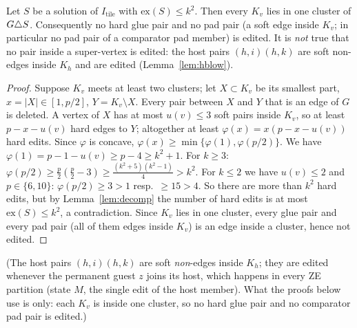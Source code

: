\begin{lemma}\label{lem:hsplit}
Let $S$ be a solution of $I_{\mathrm{tile}}$ with $\mathrm{ex}(S)\le k^2$. Then every $K_v$ lies in one cluster of $G\triangle S$. Consequently no hard glue pair and no pad pair (a soft edge inside $K_v$; in particular no pad pair of a comparator pad member) is edited. It is \emph{not} true that no pair inside a super-vertex is edited: the host pairs $(h,i)(h,k)$ are soft non-edges inside $K_h$ and are edited (Lemma~\ref{lem:hblow}).
\end{lemma}
\begin{proof}
Suppose $K_v$ meets at least two clusters; let $X\subset K_v$ be its smallest part, $x=|X|\in[1,p/2]$, $Y=K_v\setminus X$. Every pair between $X$ and $Y$ that is an edge of $G$ is deleted. A vertex of $X$ has at most $u(v)\le3$ soft pairs inside $K_v$, so at least $p-x-u(v)$ hard edges to $Y$; altogether at least $\varphi(x)=x(p-x-u(v))$ hard edits. Since $\varphi$ is concave, $\varphi(x)\ge\min\{\varphi(1),\varphi(p/2)\}$. We have $\varphi(1)=p-1-u(v)\ge p-4\ge k^2+1$. For $k\ge3$: $\varphi(p/2)\ge\frac p2(\frac p2-3)\ge\frac{(k^2+5)(k^2-1)}4>k^2$. For $k\le2$ we have $u(v)\le2$ and $p\in\{6,10\}$: $\varphi(p/2)\ge3>1$ resp.\ $\ge15>4$. So there are more than $k^2$ hard edits, but by Lemma~\ref{lem:decomp} the number of hard edits is at most $\mathrm{ex}(S)\le k^2$, a contradiction. Since $K_v$ lies in one cluster, every glue pair and every pad pair (all of them edges inside $K_v$) is an edge inside a cluster, hence not edited.
\end{proof}
(The host pairs $(h,i)(h,k)$ are soft \emph{non}-edges inside $K_h$; they are edited whenever the permanent guest $z$ joins its host, which happens in every ZE partition (state $M$, the single edit of the host member). What the proofs below use is only: each $K_v$ is inside one cluster, so no hard glue pair and no comparator pad pair is edited.)

